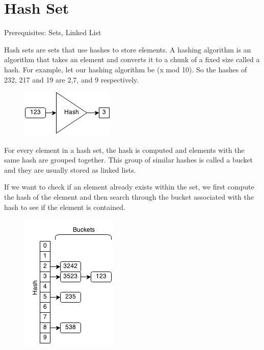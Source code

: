 \documentclass[11pt,oneside]{book}
\makeatletter
\def\maxwidth#1{\ifdim\Gin@nat@width>#1 #1\else\Gin@nat@width\fi}
\makeatother
\begin{document}
        \section{ Hash Set }
        

Prerequisites: Sets, Linked List



Hash sets are sets that use hashes to store elements. A hashing algorithm is an algorithm that takes an element and converts it to a chunk of a fixed size called a hash. For example, let our hashing algorithm be (x mod 10). So the hashes of 232, 217 and 19 are 2,7, and 9 respectively.

\vspace{5px}\begin{figure}[H]\centering
        \includegraphics[width=0.66\maxwidth{\textwidth}]{hashcode.png}
        \end{figure}

For every element in a hash set, the hash is computed and elements with the same hash are grouped together. This group of similar hashes is called a bucket and they are usually stored as linked lists.

If we want to check if an element already exists within the set, we first compute the hash of the element and then search through the bucket associated with the hash to see if the element is contained.

\vspace{5px}\begin{figure}[H]\centering
        \includegraphics[width=0.66\maxwidth{\textwidth}]{hashset.png}
        \end{figure}
\end{document}
